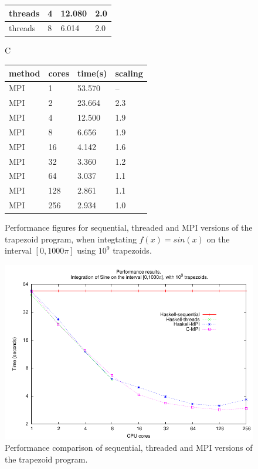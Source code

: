 \documentclass{tmr}
\begin{document}
\begin{figure}
\begin{minipage}[t]{0.5\linewidth}
\begin{tabular}{|l|l|l|l|}
threads & 4    & 12.080  & 2.0 \\ \hline
threads & 8    & 6.014  &  2.0 \\ \hline
\end{tabular}
\end{minipage}
\begin{minipage}[t]{0.5\linewidth}
\centering
C \\[3mm]
\begin{tabular}{|l|l|l|l|} \hline
method & cores & time(s) & scaling \\ \hline\hline
MPI & 1      & 53.570  & -- \\ \hline
MPI & 2      & 23.664  & 2.3 \\ \hline
MPI & 4      & 12.500  & 1.9 \\ \hline
MPI & 8      &  6.656  & 1.9 \\ \hline
MPI & 16     &  4.142  & 1.6 \\ \hline
MPI & 32     &  3.360  & 1.2 \\ \hline
MPI & 64     &  3.037  & 1.1 \\ \hline
MPI & 128    &  2.861  & 1.1 \\ \hline
MPI & 256    &  2.934  & 1.0 \\ \hline
\end{tabular}
\end{minipage}
\vspace{3mm}
\caption{Performance figures for sequential, threaded and MPI versions of the trapezoid program,
when integtating $f(x) = sin(x)$ on the interval $[0,1000 \pi]$ using $10^9$ trapezoids. \label{TiminigTable}}
\end{figure}

\begin{figure}
\centering
\includegraphics{performance.pdf}
\vspace{3mm}
\caption{Performance comparison of sequential, threaded and MPI versions of the trapezoid program.
\label{PerformanceGraph}}
\end{figure}
\end{document}
